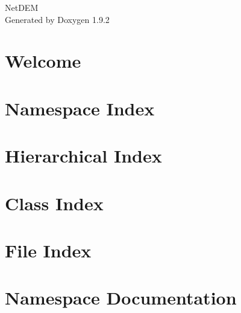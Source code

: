 \documentclass[twoside]{book}
\newcommand{\+}{\discretionary{\mbox{\scriptsize$\hookleftarrow$}}{}{}}
\newcommand{\clearemptydoublepage}{%
    \newpage{\pagestyle{empty}\cleardoublepage}%
  }
\begin{document}
  \raggedbottom
    \hypersetup{pageanchor=false,
                bookmarksnumbered=true,
                pdfencoding=unicode
               }
  \begin{titlepage}
  \vspace*{7cm}
  \begin{center}%
  {\Large Net\+DEM}\\
  \vspace*{1cm}
  {\large Generated by Doxygen 1.9.2}\\
  \end{center}
  \end{titlepage}
  \clearemptydoublepage
  \tableofcontents
  \clearemptydoublepage
  \hypersetup{pageanchor=true}
\chapter{Welcome}
\label{index}\hypertarget{index}{}
\chapter{Namespace Index}

\chapter{Hierarchical Index}

\chapter{Class Index}

\chapter{File Index}

\chapter{Namespace Documentation}



\end{document}

